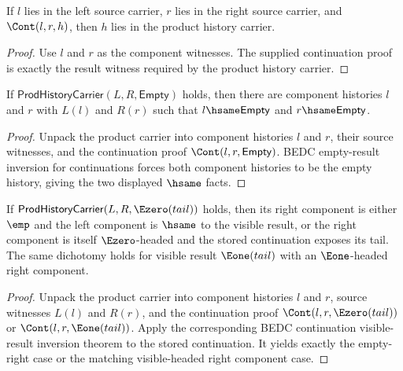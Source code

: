 \begin{theorem}
\label{thm:prod-history-carrier-cont-intro}
If \(l\) lies in the left source carrier, \(r\) lies in the right source
carrier, and \(\Cont(l,r,h)\), then \(h\) lies in the product history carrier.
\end{theorem}
\begin{proof}
Use \(l\) and \(r\) as the component witnesses. The supplied continuation
proof is exactly the result witness required by the product history carrier.
\end{proof}

\begin{theorem}
\label{thm:prod-history-carrier-empty-result-components}
If $\mathsf{ProdHistoryCarrier}(L,R,\mathsf{Empty})$ holds, then there are
component histories $l$ and $r$ with $L(l)$ and $R(r)$ such that
$l\hsame\mathsf{Empty}$ and $r\hsame\mathsf{Empty}$.
\end{theorem}
\begin{proof}
Unpack the product carrier into component histories $l$ and $r$, their source
witnesses, and the continuation proof $\Cont(l,r,\mathsf{Empty})$. BEDC
empty-result inversion for continuations forces both component histories to be
the empty history, giving the two displayed $\hsame$ facts.
\end{proof}

\begin{theorem}
\label{thm:prod-history-carrier-visible-result-cases}
If $\mathsf{ProdHistoryCarrier}(L,R,\Ezero(tail))$ holds, then its right
component is either $\emp$ and the left component is $\hsame$ to the visible
result, or the right component is itself $\Ezero$-headed and the stored
continuation exposes its tail. The same dichotomy holds for visible result
$\Eone(tail)$ with an $\Eone$-headed right component.
\end{theorem}
\begin{proof}
Unpack the product carrier into component histories $l$ and $r$, source
witnesses $L(l)$ and $R(r)$, and the continuation proof
$\Cont(l,r,\Ezero(tail))$ or $\Cont(l,r,\Eone(tail))$. Apply the corresponding
BEDC continuation visible-result inversion theorem to the stored continuation.
It yields exactly the empty-right case or the matching visible-headed right
component case.
\end{proof}

